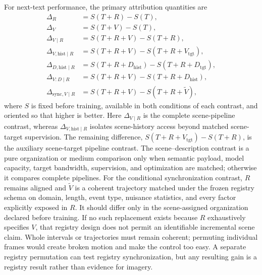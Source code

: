 \documentclass[11pt]{article}
\begin{document}
For next-text performance, the primary attribution quantities are
\begin{align}
  \Delta_R
  &=S(T+R)-S(T),\\
  \Delta_V
  &=S(T+V)-S(T),\\
  \Delta_{V\mid R}
  &=S(T+R+V)-S(T+R),\\
  \Delta_{V,\mathrm{hist}\mid R}
  &=S(T+R+V)-S(T+R+V_{\mathrm{tgt}}),\\
  \Delta_{D,\mathrm{hist}\mid R}
  &=S(T+R+D_{\mathrm{hist}})-S(T+R+D_{\mathrm{tgt}}),\\
  \Delta_{V:D\mid R}
  &=S(T+R+V)-S(T+R+D_{\mathrm{hist}}),\\
  \Delta_{\mathrm{sync},V\mid R}
  &=S(T+R+V)-S(T+R+\widetilde V),
  \label{eq:sync}
\end{align}
where $S$ is fixed before training, available in both conditions of each contrast, and oriented so that higher is better. Here $\Delta_{V\mid R}$ is the complete scene-pipeline contrast, whereas $\Delta_{V,\mathrm{hist}\mid R}$ isolates scene-history access beyond matched scene-target supervision. The remaining difference, $S(T+R+V_{\mathrm{tgt}})-S(T+R)$, is the auxiliary scene-target pipeline contrast. The scene--description contrast is a pure organization or medium comparison only when semantic payload, model capacity, target bandwidth, supervision, and optimization are matched; otherwise it compares complete pipelines. For the conditional synchronization contrast, $R$ remains aligned and $\widetilde V$ is a coherent trajectory matched under the frozen registry schema on domain, length, event type, nuisance statistics, and every factor explicitly exposed in $R$. It should differ only in the scene-assigned organization declared before training. If no such replacement exists because $R$ exhaustively specifies $V$, that registry design does not permit an identifiable incremental scene claim. Whole intervals or trajectories must remain coherent; permuting individual frames would create broken motion and make the control too easy. A separate registry permutation can test registry synchronization, but any resulting gain is a registry result rather than evidence for imagery.
\end{document}
